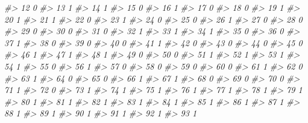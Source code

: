 \documentclass[]{book}
\newenvironment{Shaded}{\begin{snugshade}}{\end{snugshade}}
\newcommand{\CommentTok}[1]{\textcolor[rgb]{0.56,0.35,0.01}{\textit{#1}}}
\begin{document}
\begin{Shaded}
\begin{Highlighting}[]
\CommentTok{#> 12            0}
\CommentTok{#> 13            1}
\CommentTok{#> 14            1}
\CommentTok{#> 15            0}
\CommentTok{#> 16            1}
\CommentTok{#> 17            0}
\CommentTok{#> 18            0}
\CommentTok{#> 19            1}
\CommentTok{#> 20            1}
\CommentTok{#> 21            1}
\CommentTok{#> 22            0}
\CommentTok{#> 23            1}
\CommentTok{#> 24            0}
\CommentTok{#> 25            0}
\CommentTok{#> 26            1}
\CommentTok{#> 27            0}
\CommentTok{#> 28            0}
\CommentTok{#> 29            0}
\CommentTok{#> 30            0}
\CommentTok{#> 31            0}
\CommentTok{#> 32            1}
\CommentTok{#> 33            1}
\CommentTok{#> 34            1}
\CommentTok{#> 35            0}
\CommentTok{#> 36            0}
\CommentTok{#> 37            1}
\CommentTok{#> 38            0}
\CommentTok{#> 39            0}
\CommentTok{#> 40            0}
\CommentTok{#> 41            1}
\CommentTok{#> 42            0}
\CommentTok{#> 43            0}
\CommentTok{#> 44            0}
\CommentTok{#> 45            0}
\CommentTok{#> 46            1}
\CommentTok{#> 47            1}
\CommentTok{#> 48            1}
\CommentTok{#> 49            0}
\CommentTok{#> 50            0}
\CommentTok{#> 51            1}
\CommentTok{#> 52            1}
\CommentTok{#> 53            1}
\CommentTok{#> 54            1}
\CommentTok{#> 55            0}
\CommentTok{#> 56            1}
\CommentTok{#> 57            0}
\CommentTok{#> 58            0}
\CommentTok{#> 59            0}
\CommentTok{#> 60            0}
\CommentTok{#> 61            1}
\CommentTok{#> 62            0}
\CommentTok{#> 63            1}
\CommentTok{#> 64            0}
\CommentTok{#> 65            0}
\CommentTok{#> 66            1}
\CommentTok{#> 67            1}
\CommentTok{#> 68            0}
\CommentTok{#> 69            0}
\CommentTok{#> 70            0}
\CommentTok{#> 71            1}
\CommentTok{#> 72            0}
\CommentTok{#> 73            1}
\CommentTok{#> 74            1}
\CommentTok{#> 75            1}
\CommentTok{#> 76            1}
\CommentTok{#> 77            1}
\CommentTok{#> 78            1}
\CommentTok{#> 79            1}
\CommentTok{#> 80            1}
\CommentTok{#> 81            1}
\CommentTok{#> 82            1}
\CommentTok{#> 83            1}
\CommentTok{#> 84            1}
\CommentTok{#> 85            1}
\CommentTok{#> 86            1}
\CommentTok{#> 87            1}
\CommentTok{#> 88            1}
\CommentTok{#> 89            1}
\CommentTok{#> 90            1}
\CommentTok{#> 91            1}
\CommentTok{#> 92            1}
\CommentTok{#> 93            1}

\end{Highlighting}
\end{Shaded}
\end{document}
